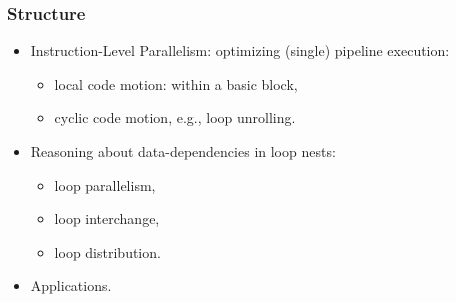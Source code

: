 \documentclass[rgb,dvipsnames]{beamer}
\begin{document}
\begin{frame}[fragile,t]
  \frametitle{Structure}

\begin{itemize}
    \item Instruction-Level Parallelism: optimizing (single) pipeline execution:
            \begin{itemize}
                \item local code motion: within a basic block,
                \item cyclic code motion, e.g., loop unrolling.
            \end{itemize}
            \bigskip

    \item Reasoning about data-dependencies in loop nests:
            \begin{itemize}
                \item loop parallelism,
                \item loop interchange,
                \item loop distribution.
            \end{itemize}\bigskip

    \item Applications.
\end{itemize}

\end{frame}
\end{document}
